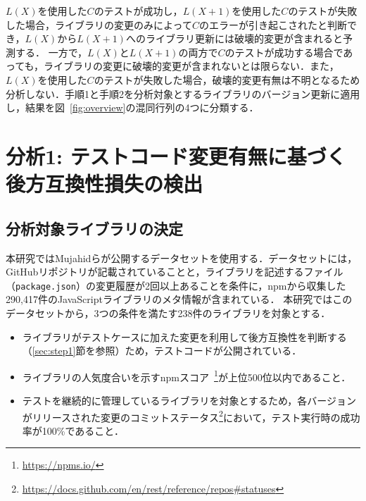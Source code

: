 \documentclass[submit]{ipsj}
\begin{document}
$L(X)$を使用した$C$のテストが成功し，$L(X+1)$を使用した$C$のテストが失敗した場合，ライブラリの変更のみによって$C$のエラーが引き起こされたと判断でき，$L(X)$から$L(X+1)$へのライブラリ更新には破壊的変更が含まれると予測する．
一方で，$L(X)$と$L(X+1)$の両方で$C$のテストが成功する場合であっても，ライブラリの変更に破壊的変更が含まれないとは限らない．また，$L(X)$を使用した$C$のテストが失敗した場合，破壊的変更有無は不明となるため分析しない．手順1と手順2を分析対象とするライブラリのバージョン更新に適用し，結果を図~\ref{fig:overview}の混同行列の4つに分類する．


\section{分析1: テストコード変更有無に基づく後方互換性損失の検出}
\label{sec:prepare}


\subsection{分析対象ライブラリの決定}
本研究ではMujahidらが公開するデータセット\cite{mujahid}を使用する．データセットには，GitHubリポジトリが記載されていることと，ライブラリを記述するファイル（{\verb|package.json|}）の変更履歴が2回以上あることを条件に，npmから収集した290,417件のJavaScriptライブラリのメタ情報が含まれている．
本研究ではこのデータセットから，3つの条件を満たす238件のライブラリを対象とする．

\begin{itemize}
\item ライブラリがテストケースに加えた変更を利用して後方互換性を判断する（\ref{sec:step1}節を参照）ため，テストコードが公開されている．
\item ライブラリの人気度合いを示すnpmスコア~\footnote{\url{https://npms.io/}}が上位500位以内であること．
\item テストを継続的に管理しているライブラリを対象とするため，各バージョンがリリースされた変更のコミットステータス\footnote{\url{https://docs.github.com/en/rest/reference/repos#statuses}}において，テスト実行時の成功率が100\%であること．
\end{itemize}

\end{document}
